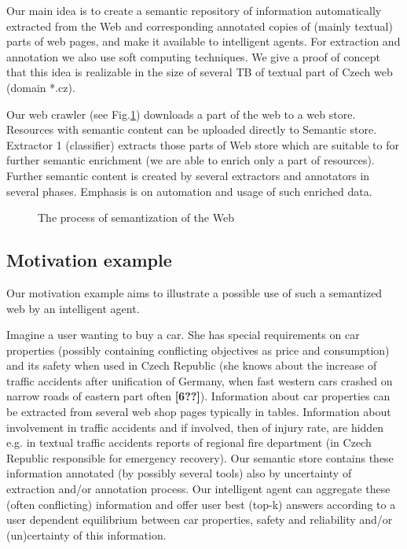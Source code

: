 \documentclass{sig-alternate}
\begin{document}
Our main idea is to create a semantic repository of information automatically extracted from the Web and corresponding annotated copies of (mainly textual) parts of web pages, and make it available to intelligent agents. For extraction and annotation we also use soft computing techniques. We give a proof of concept that this idea is realizable in the size of several TB of textual part of Czech web (domain *.cz).

Our web crawler (see Fig.\ref{img:Semantization}) downloads a part of the web to a web store. Resources with semantic content can be uploaded directly to Semantic store. Extractor 1 (classifier) extracts those parts of Web store which are suitable to for further semantic enrichment (we are able to enrich only a part of resources). Further semantic content is created by several extractors and annotators in several phases. Emphasis is on automation and usage of such enriched data.

\begin{figure}
\centering
{}
\caption{The process of semantization of the Web}
\label{img:Semantization}
\end{figure}


\subsection{Motivation example}

Our motivation example aims to illustrate a possible use of such a semantized web by an intelligent agent. 

Imagine a user wanting to buy a car. She has special requirements on car properties (possibly containing conflicting objectives as price and consumption) and its safety when used in Czech Republic (she knows about the increase of traffic accidents after unification of Germany, when fast western cars crashed on narrow roads of eastern part often \textbf{[6??]}).  Information about car properties can be extracted from several web shop pages typically in tables. Information about involvement in traffic accidents and if involved, then of injury rate, are hidden e.g. in textual traffic accidents reports of regional fire department (in Czech Republic responsible for emergency recovery). Our semantic store contains these information annotated (by possibly several tools) also by uncertainty of extraction and/or annotation process. Our intelligent agent can aggregate these (often conflicting) information and offer user best (top-k) answers according to a user dependent equilibrium between car properties, safety and reliability and/or (un)certainty of this information.
\end{document}
